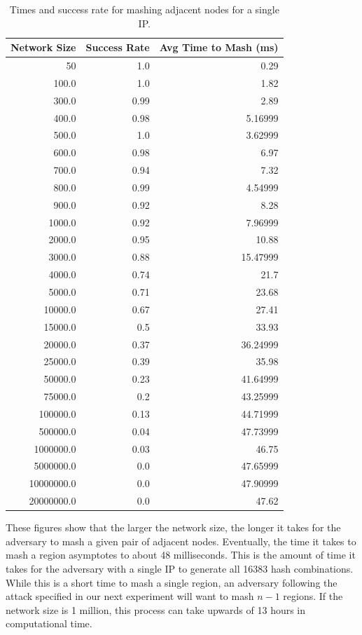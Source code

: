\documentclass[11pt,conference]{IEEEtran}
\begin{document}
\begin{table}\small
    \centering
    \caption{Times and success rate for mashing adjacent nodes for a single IP.}
    \label{tab:exp1}
\begin{tabular}{|r|r|r|}
    \hline
    Network Size &  Success Rate &  Avg Time to Mash (ms) \\ \hline
    50 & 1.0 & 0.29 \\ \hline
    100.0 & 1.0 & 1.82 \\ \hline
    300.0 & 0.99 & 2.89 \\ \hline
    400.0 & 0.98 & 5.16999 \\ \hline
    500.0 & 1.0 & 3.62999 \\ \hline
    600.0 & 0.98 & 6.97 \\ \hline
    700.0 & 0.94 & 7.32 \\ \hline
    800.0 & 0.99 & 4.54999 \\ \hline
    900.0 & 0.92 & 8.28 \\ \hline
    1000.0 & 0.92 & 7.96999 \\ \hline
    2000.0 & 0.95 & 10.88 \\ \hline
    3000.0 & 0.88 & 15.47999 \\ \hline
    4000.0 & 0.74 & 21.7 \\ \hline
    5000.0 & 0.71 & 23.68 \\ \hline
    10000.0 & 0.67 & 27.41 \\ \hline
    15000.0 & 0.5 & 33.93 \\ \hline
    20000.0 & 0.37 & 36.24999 \\ \hline
    25000.0 & 0.39 & 35.98 \\ \hline
    50000.0 & 0.23 & 41.64999 \\ \hline
    75000.0 & 0.2 & 43.25999 \\ \hline
    100000.0 & 0.13 & 44.71999 \\ \hline
    500000.0 & 0.04 & 47.73999 \\ \hline
    1000000.0 & 0.03 & 46.75 \\ \hline
    5000000.0 & 0.0 & 47.65999 \\ \hline
    10000000.0 & 0.0 & 47.90999 \\ \hline
    20000000.0 & 0.0 & 47.62 \\ \hline
    
\end{tabular}
\end{table}
These figures show that the larger the network size, the longer it takes for the adversary to mash a given pair of adjacent nodes.
Eventually, the time it takes to mash a region asymptotes to about 48 milliseconds.
This is the amount of time it takes for the adversary with a single IP to generate all 16383 hash combinations.
While this is a short time to mash a single region, an adversary following the attack specified in our next experiment will want to mash $n-1$ regions.
If the network size is 1 million, this process can take upwards of 13 hours in computational time.
\end{document}
